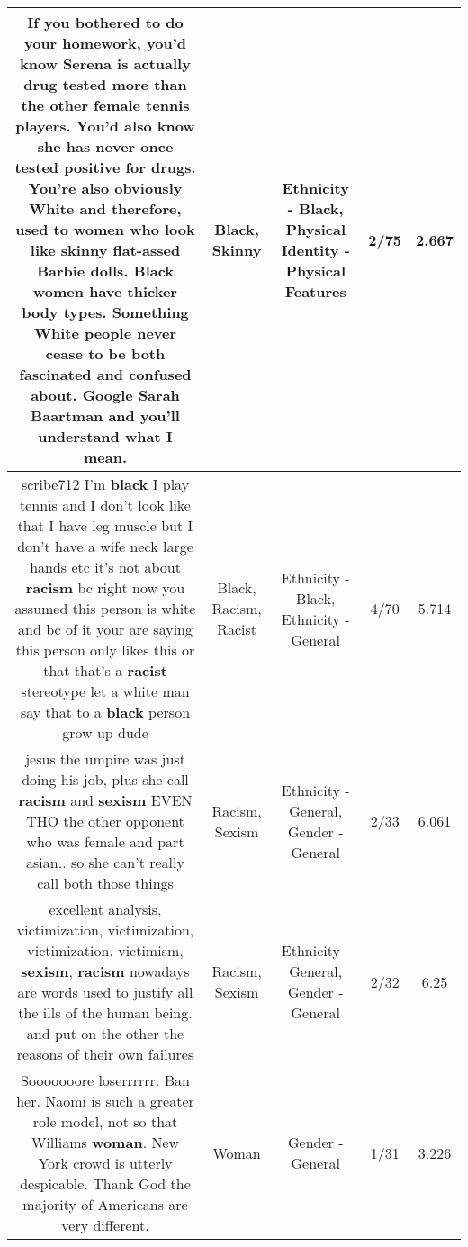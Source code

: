 \documentclass[11pt]{article}
\newlength\mylength
\begin{document}
\begin{center}
\begin{longtable}{|C{.65\mylength}|C{.30\mylength}|C{.12\mylength}|C{.12\mylength}|C{.12\mylength}|}
  \small If you bothered to do your homework, you'd know Serena is actually drug tested more than the other female tennis players. You'd also know she has never once tested positive for drugs. You're also obviously White and therefore, used to women who look like \textbf{skinny} flat-assed Barbie dolls. \textbf{Black} women have thicker body types. Something White people never cease to be both fascinated and confused about. Google Sarah Baartman and you'll understand what I mean.\normalsize   & Black, Skinny & Ethnicity - Black, Physical Identity - Physical Features & 2/75 & 2.667 \\  \hline
  \small scribe712 I'm \textbf{black} I play tennis and I don't look like that I have leg muscle but I don't have a wife neck large hands etc it's not about \textbf{racism} bc right now you assumed this person is white and bc of it your are saying this person only likes this or that that's a \textbf{racist} stereotype let a white man say that to a \textbf{black} person grow up dude\normalsize   & Black, Racism, Racist & Ethnicity - Black, Ethnicity - General & 4/70 & 5.714 \\  \hline
  \small jesus the umpire was just doing his job, plus she call \textbf{racism} and \textbf{sexism} EVEN THO the other opponent who was female and part asian.. so she can't really call both those things\normalsize   & Racism, Sexism & Ethnicity - General, Gender - General & 2/33 & 6.061 \\  \hline
  \small excellent analysis, victimization, victimization, victimization. victimism, \textbf{sexism}, \textbf{racism} nowadays are words used to justify all the ills of the human being. and put on the other the reasons of their own failures\normalsize   & Racism, Sexism & Ethnicity - General, Gender - General & 2/32 & 6.25 \\  \hline
  \small Sooooooore loserrrrrr. Ban her. Naomi is such a greater role model, not so that Williams \textbf{woman}. New York crowd is utterly despicable. Thank God the majority of Americans are very different.\normalsize   & Woman & Gender - General & 1/31 & 3.226 \\  \hline

\end{longtable}
\end{center}
\end{document}
